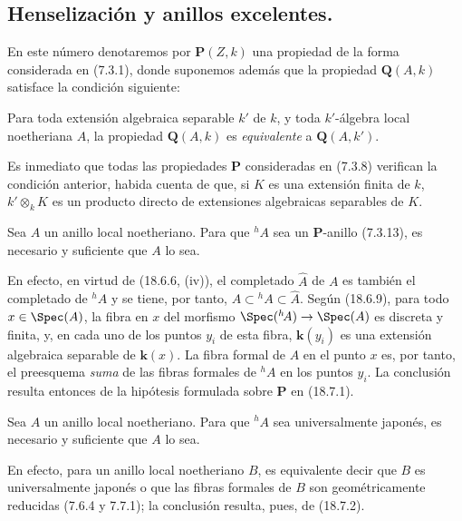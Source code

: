 \subsection{Henselización y anillos excelentes.}
\label{subsection:IV.18.7}

\begin{env}[18.7.1]
\label{IV.18.7.1}
En este número denotaremos por $\boldsymbol{P}(Z,k)$ una propiedad de la forma considerada en (7.3.1), donde suponemos además que la propiedad $\boldsymbol{Q}(A,k)$ satisface la condición siguiente:

Para toda extensión algebraica separable $k'$ de $k$, y toda $k'$-álgebra local noetheriana $A$, la propiedad $\boldsymbol{Q}(A,k)$ es \emph{equivalente} a $\boldsymbol{Q}(A,k')$.

Es inmediato que todas las propiedades $\boldsymbol{P}$ consideradas en (7.3.8) verifican la condición anterior, habida cuenta de que, si $K$ es una extensión finita de $k$, $k'\otimes_k K$ es un producto directo de extensiones algebraicas separables de $K$.
\end{env}


\begin{proposition}[18.7.2]
\label{IV.18.7.2}
Sea $A$ un anillo local noetheriano. Para que ${}^h\!A$ sea un $\boldsymbol{P}$-anillo \textup{(7.3.13)}, es necesario y suficiente que $A$ lo sea.
\end{proposition}

En efecto, en virtud de (18.6.6, (iv)), el completado $\widehat A$ de $A$ es también el completado de ${}^h\!A$ y se tiene, por tanto, $A\subset{}^h\!A\subset\widehat A$. Según (18.6.9), para todo $x\in\Spec(A)$, la fibra en $x$ del morfismo $\Spec({}^h\!A)\to\Spec(A)$ es discreta y finita, y, en cada uno de los puntos $y_i$ de esta fibra, $\boldsymbol{k}(y_i)$ es una extensión algebraica separable de $\boldsymbol{k}(x)$. La fibra formal de $A$ en el punto $x$ es, por tanto, el preesquema \emph{suma} de las fibras formales de ${}^h\!A$ en los puntos $y_i$. La conclusión resulta entonces de la hipótesis formulada sobre $\boldsymbol{P}$ en (18.7.1).

\begin{corollary}[18.7.3]
\label{IV.18.7.3}
Sea $A$ un anillo local noetheriano. Para que ${}^h\!A$ sea universalmente japonés, es necesario y suficiente que $A$ lo sea.
\end{corollary}

En efecto, para un anillo local noetheriano $B$, es equivalente decir que $B$ es universalmente japonés o que las fibras formales de $B$ son geométricamente reducidas (7.6.4 y 7.7.1); la conclusión resulta, pues, de (18.7.2).

